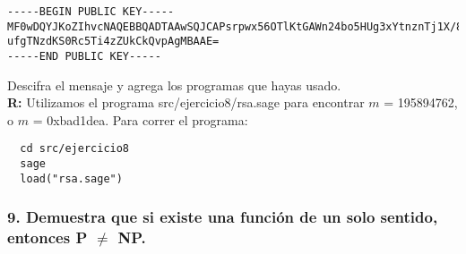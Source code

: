 \documentclass[14pt]{article}
\begin{document}
\begin{verbatim}
-----BEGIN PUBLIC KEY-----
MF0wDQYJKoZIhvcNAQEBBQADTAAwSQJCAPsrpwx56OTlKtGAWn24bo5HUg3xYtnznTj1X/8Hq7pLYNIVE57Yxoyr3zTOOBJ
ufgTNzdKS0Rc5Ti4zZUkCkQvpAgMBAAE=
-----END PUBLIC KEY-----
\end{verbatim}

Descifra el mensaje y agrega los programas que hayas usado. \\

\textbf{R:} Utilizamos el programa \textsf{src/ejercicio8/rsa.sage} para encontrar $m$ = 195894762, o $m$ = 0xbad1dea. Para correr el programa:
\begin{verbatim}
  cd src/ejercicio8
  sage
  load("rsa.sage")
\end{verbatim}

\subsubsection*{9. Demuestra que si existe una función de un solo sentido, entonces P $\neq$ NP.}
\end{document}
